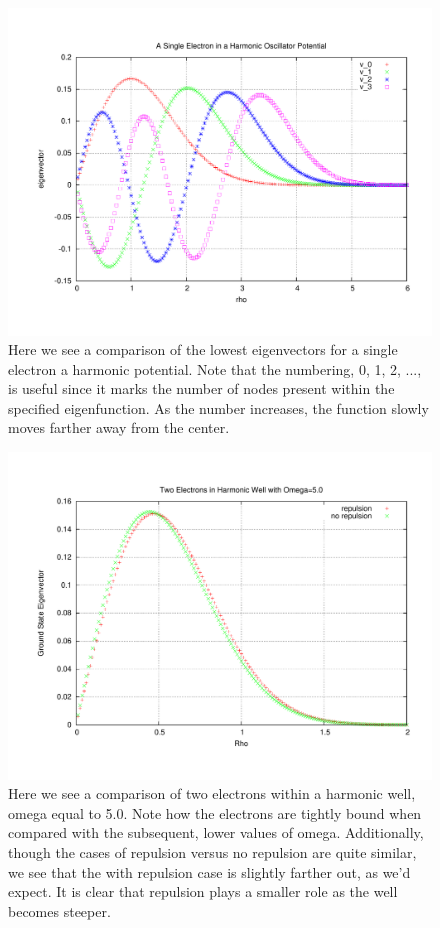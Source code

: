 \documentclass[11pt,a4paper]{article}
\begin{document}
{\begin{figure}
\includegraphics[width=1.0\textwidth]{1eHOcomparison.pdf}
\caption{Here we see a comparison of the lowest eigenvectors for a single electron a harmonic potential. Note that the numbering, 0, 1, 2, ..., is useful since it marks the number of nodes present within the specified eigenfunction. As the number increases, the function slowly moves farther away from the center.}
\end{figure}
\begin{figure}
\centering
\includegraphics[width=1.0\textwidth]{2e_500.pdf}
\caption{Here we see a comparison of two electrons within a harmonic well, omega equal to 5.0. Note how the electrons are tightly bound when compared with the subsequent, lower values of omega. Additionally, though the cases of repulsion versus no repulsion are quite similar, we see that the with repulsion case is slightly farther out, as we'd expect. It is clear that repulsion plays a smaller role as the well becomes steeper.}

\end{figure}}
\end{document}

